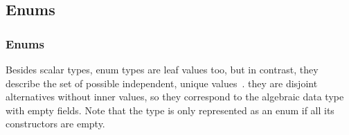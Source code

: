 \subsection{Enums}

\begin{frame}\frametitle{Enums}

Besides scalar types, enum types are leaf values too, but in contrast, they describe the set of possible independent, unique values~\cite{gql-spec}. they are disjoint alternatives without inner values, so they correspond to the algebraic data type with empty fields. Note that the type is only represented as an enum if all its constructors are empty.


\end{frame}


